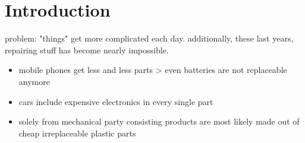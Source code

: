 
\chapter{Introduction}
	
	problem: "things" get more complicated each day. additionally, these last years, repairing stuff has become nearly impossible.
	
	
	\begin{itemize}
		\itemsep0em
		\item mobile phones get less and less parts > even batteries are not replaceable anymore
		\item cars include expensive electronics in every single part
		\item solely from mechanical party consisting products are most likely made out of cheap irreplaceable plastic parts
	\end{itemize}
	
